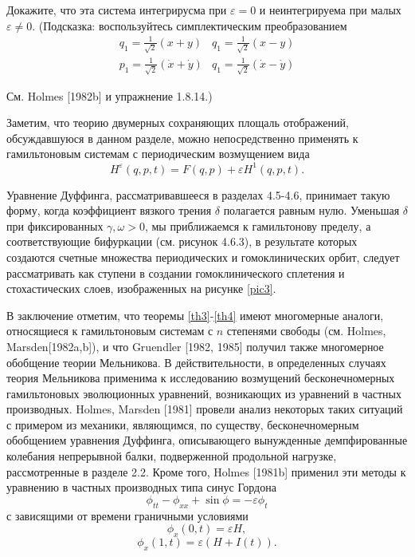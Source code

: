 \documentclass[twoside, a4paper]{article}
\begin{document}

Докажите, что эта система интегрирусма при $\varepsilon = 0$ и неинтегрируема при малых $\varepsilon \neq 0$. (Подсказка: воспользуйтесь симплектическим преобразованием
$$\begin{array}{cc}
q_1=\frac{1}{\sqrt{2}}(x+y) & q_1=\frac{1}{\sqrt{2}}(x-y)\\
p_1=\frac{1}{\sqrt{2}}(\dot x+\dot y) & q_1=\frac{1}{\sqrt{2}}(\dot x-\dot y)
\end{array}$$

См. Holmes [1982b] и упражнение 1.8.14.)

Заметим, что теорию двумерных сохраняющих площаль отображений, обсуждавшуюся в данном разделе, можно непосредственно применять к гамильтоновым системам с периодическим возмущением вида
\begin{equation}
H^\varepsilon(q,p,t)=F(q,p)+\varepsilon H^1(q,p,t).
\end{equation}

Уравнение Дуффинга, рассматривавшееся в разделах 4.5-4.6, принимает такую форму, когда коэффициент вязкого трения $\delta$ полагается равным нулю. Уменьшая $\delta$ при фиксированных $\gamma, \omega >0$, мы приближаемся к гамильтонову пределу, а соответствующие бифуркации (см. рисунок 4.6.3), в результате
которых создаются счетные множества периодических и гомоклинических орбит, следует рассматривать как ступени в создании гомоклинического сплетения и стохастических слоев, изображенных на рисунке \ref{pic3}.

В заключение отметим, что теоремы \ref{th3}-\ref{th4} имеют многомерные аналоги, относящиеся к гамильтоновым системам с $n$ степенями свободы (см. Holmes, Marsden[1982a,b]), и что Gruendler [1982, 1985] получил также многомерное обобщение теории Мельникова. В действительности, в определенных случаях теория Мельникова применима к исследованию возмущений бесконечномерных гамильтоновых эволюционных уравнений, возникающих из уравнений в частных производных.  Holmes, Marsden [1981] провели анализ некоторых таких ситуаций с примером из механики, являющимся, по существу, бесконечномерным обобщением уравнения Дуффинга, описывающего вынужденные демпфированные колебания непрерывной балки, подверженной продольной нагрузке, рассмотренные в разделе 2.2. Кроме того, Holmes [1981b] применил эти методы к уравнению в частных
производных типа синус Гордона
$$\phi_{tt}-\phi_{xx}+\sin\phi=-\varepsilon\phi_t$$
с зависящими от времени граничными условиями
$$\phi_x(0,t)=\varepsilon H,$$
$$\phi_x(1,t)= \varepsilon (H+I(t)).$$
\end{document}
